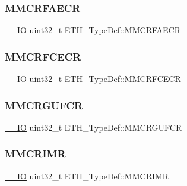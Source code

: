 \mbox{\label{struct_e_t_h___type_def_ad057b9031295ab3b64e79145f7607469}} 
\subsubsection{\texorpdfstring{MMCRFAECR}{MMCRFAECR}}
{\footnotesize\ttfamily \mbox{\hyperlink{group___c_m_s_i_s___c_m3__core__definitions_gaec43007d9998a0a0e01faede4133d6be}{\+\_\+\+\_\+\+IO}} uint32\+\_\+t E\+T\+H\+\_\+\+Type\+Def\+::\+M\+M\+C\+R\+F\+A\+E\+CR}

\mbox{\label{struct_e_t_h___type_def_afe50f13adc614758cba541f942e8ef0e}} 
\subsubsection{\texorpdfstring{MMCRFCECR}{MMCRFCECR}}
{\footnotesize\ttfamily \mbox{\hyperlink{group___c_m_s_i_s___c_m3__core__definitions_gaec43007d9998a0a0e01faede4133d6be}{\+\_\+\+\_\+\+IO}} uint32\+\_\+t E\+T\+H\+\_\+\+Type\+Def\+::\+M\+M\+C\+R\+F\+C\+E\+CR}

\mbox{\label{struct_e_t_h___type_def_a832a684c8f476941845d0fcba0fb75fc}} 
\subsubsection{\texorpdfstring{MMCRGUFCR}{MMCRGUFCR}}
{\footnotesize\ttfamily \mbox{\hyperlink{group___c_m_s_i_s___c_m3__core__definitions_gaec43007d9998a0a0e01faede4133d6be}{\+\_\+\+\_\+\+IO}} uint32\+\_\+t E\+T\+H\+\_\+\+Type\+Def\+::\+M\+M\+C\+R\+G\+U\+F\+CR}

\mbox{\label{struct_e_t_h___type_def_a80c2cf41b95fc14f304d60e4421b1bbd}} 
\subsubsection{\texorpdfstring{MMCRIMR}{MMCRIMR}}
{\footnotesize\ttfamily \mbox{\hyperlink{group___c_m_s_i_s___c_m3__core__definitions_gaec43007d9998a0a0e01faede4133d6be}{\+\_\+\+\_\+\+IO}} uint32\+\_\+t E\+T\+H\+\_\+\+Type\+Def\+::\+M\+M\+C\+R\+I\+MR}

